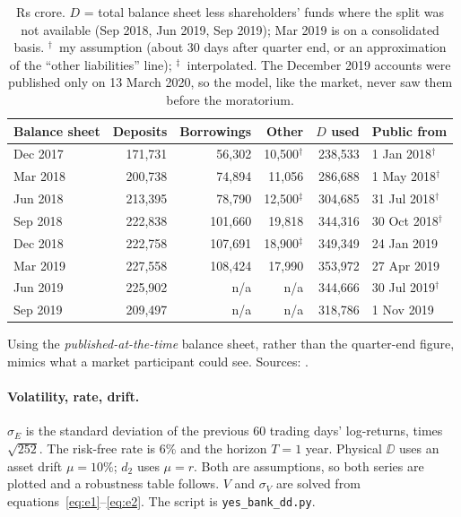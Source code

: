 \begin{table}[H]\centering\small
\begin{tabular}{@{}lrrrrl@{}}\toprule
\textbf{Balance sheet} & \textbf{Deposits} & \textbf{Borrowings} & \textbf{Other} & \textbf{$D$ used} & \textbf{Public from}\\\midrule
Dec 2017 & 171,731 & 56,302 & 10,500$^\dagger$ & 238,533 & 1 Jan 2018$^\dagger$\\
Mar 2018 & 200,738 & 74,894 & 11,056 & 286,688 & 1 May 2018$^\dagger$\\
Jun 2018 & 213,395 & 78,790 & 12,500$^\ddagger$ & 304,685 & 31 Jul 2018$^\dagger$\\
Sep 2018 & 222,838 & 101,660 & 19,818 & 344,316 & 30 Oct 2018$^\dagger$\\
Dec 2018 & 222,758 & 107,691 & 18,900$^\ddagger$ & 349,349 & 24 Jan 2019\\
Mar 2019 & 227,558 & 108,424 & 17,990 & 353,972 & 27 Apr 2019\\
Jun 2019 & 225,902 & n/a & n/a & 344,666 & 30 Jul 2019$^\dagger$\\
Sep 2019 & 209,497 & n/a & n/a & 318,786 & 1 Nov 2019\\\bottomrule
\end{tabular}
\caption*{\footnotesize Rs crore. $D$ = total balance sheet less shareholders' funds where the split was not available (Sep 2018, Jun 2019, Sep 2019); Mar 2019 is on a consolidated basis. $^\dagger$~my assumption (about 30 days after quarter end, or an approximation of the ``other liabilities'' line); $^\ddagger$~interpolated. The December 2019 accounts were published only on 13 March 2020, so the model, like the market, never saw them before the moratorium.}
\end{table}
Using the \emph{published-at-the-time} balance sheet, rather than the quarter-end figure, mimics what a market participant could see. Sources: \cite{angel3q19,ycQ2,screenerYes}.

\paragraph{Volatility, rate, drift.} $\sigma_E$ is the standard deviation of the previous 60 trading days' log-returns, times $\sqrt{252}$. The risk-free rate is 6\% and the horizon $T=1$ year. Physical $\DD$ uses an asset drift $\mu=10\%$; $d_2$ uses $\mu=r$. Both are assumptions, so both series are plotted and a robustness table follows. $V$ and $\sigma_V$ are solved from equations~\eqref{eq:e1}--\eqref{eq:e2}. The script is \texttt{yes\_bank\_dd.py}.


